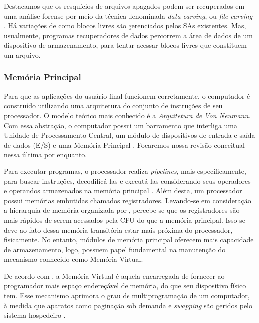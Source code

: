     \vspace{4mm}

    \hspace{1cm}
    Destacamos que os resquícios de arquivos apagados podem ser recuperados em uma análise forense por meio da técnica denominada \textit{data carving}, ou \textit{file carving} \cite{carrier2005}. Há variações de como blocos livres são gerenciados pelos SAs existentes. Mas, usualmente, programas recuperadores de dados percorrem a área de dados de um dispositivo de armazenamento, para tentar acessar blocos livres que constituem um arquivo.
    
    \subsubsection{Memória Principal}
    
    \hspace{1cm}
    Para que as aplicações do usuário final funcionem corretamente, o computador é construído utilizando uma arquitetura do conjunto de instruções de seu processador. O modelo teórico mais conhecido é a \textit{Arquitetura de Von Neumann}. Com essa abstração, o computador possui um barramento que interliga uma Unidade de Processamento Central, um módulo de dispositivos de entrada e saída de dados (E/S) e uma Memória Principal \cite{stallings2009}. Focaremos nossa revisão conceitual nessa última por enquanto.
    
    \vspace{4mm}
    
    \hspace{1cm}
    Para executar programas, o processador realiza \textit{pipelines}, mais especificamente, para buscar instruções, decodificá-las e executá-las considerando seus operadores e operandos armazenados na memória principal \cite{stallings2009}. Além desta, um processador possui memórias embutidas chamados registradores. Levando-se em consideração a hierarquia de memória organizada por , percebe-se que os registradores são mais rápidos de serem acessados pela CPU do que a memória principal. Isso se deve ao fato dessa memória transitória estar mais próxima do processador, fisicamente. No entanto, módulos de memória principal oferecem mais capacidade de armazenamento, logo, possuem papel fundamental na manutenção do mecanismo conhecido como Memória Virtual.
        
    \vspace{4mm}

    \hspace{1cm}
    De acordo com , a Memória Virtual é aquela encarregada de fornecer ao programador mais espaço endereçável de memória, do que seu dispositivo físico tem. Esse mecanismo aprimora o grau de multiprogramação de um computador, à medida que aparatos como paginação sob demanda e \textit{swapping} são geridos pelo sistema hospedeiro \cite{silberschatz2018}.
    
